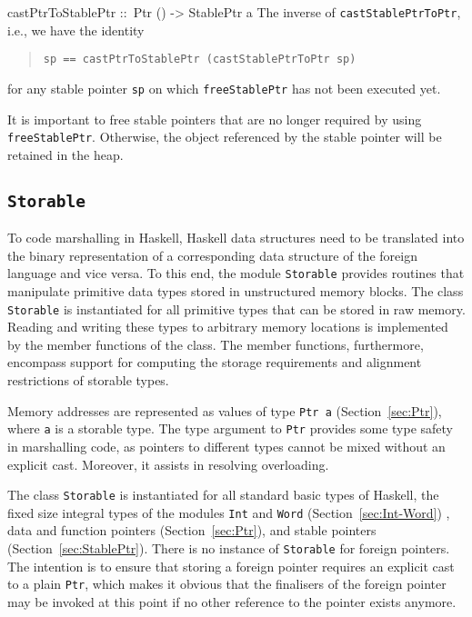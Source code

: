 \documentclass[a4paper,twosides]{article}
\makeatletter
\newcommand{\code}[1]{\texttt{#1}}      %
\newenvironment{codedesc}{%
  \list{}{\labelwidth\z@
    \let\makelabel\codedesclabel}
  }{%
  \endlist
  }
\newcommand*{\codedesclabel}[1]{%
  \hspace{-\leftmargin}
  \parbox[b]{\labelwidth}{\makebox[0pt][l]{\code{#1}}\\}\hfil\relax
  }
\makeatother
\begin{document}
\begin{codedesc}
\item[castPtrToStablePtr ::\ Ptr () -> StablePtr a] The inverse of
  \code{castStablePtrToPtr}, i.e., we have the identity
  \begin{quote}
\begin{verbatim}
sp == castPtrToStablePtr (castStablePtrToPtr sp)
\end{verbatim}
  \end{quote}
  for any stable pointer \code{sp} on which \code{freeStablePtr} has not been
  executed yet.
\end{codedesc}

It is important to free stable pointers that are no longer required by using
\code{freeStablePtr}.  Otherwise, the object referenced by the stable pointer
will be retained in the heap.


\subsection{\code{Storable}}
\label{sec:Storable}

To code marshalling in Haskell, Haskell data structures need to be translated
into the binary representation of a corresponding data structure of the
foreign language and vice versa.  To this end, the module \code{Storable}
provides routines that manipulate primitive data types stored in unstructured
memory blocks.  The class \code{Storable} is instantiated for all primitive
types that can be stored in raw memory.  Reading and writing these types to
arbitrary memory locations is implemented by the member functions of the
class.  The member functions, furthermore, encompass support for computing the
storage requirements and alignment restrictions of storable types.

Memory addresses are represented as values of type \code{Ptr a}
(Section~\ref{sec:Ptr}), where \code{a} is a storable type.  The type argument
to \code{Ptr} provides some type safety in marshalling code, as pointers to
different types cannot be mixed without an explicit cast.  Moreover, it
assists in resolving overloading.

The class \code{Storable} is instantiated for all standard basic types of
Haskell, the fixed size integral types of the modules \code{Int} and
\code{Word} (Section~\ref{sec:Int-Word}) , data and function pointers
(Section~\ref{sec:Ptr}), and stable pointers (Section~\ref{sec:StablePtr}).
There is no instance of \code{Storable} for foreign pointers.  The intention
is to ensure that storing a foreign pointer requires an explicit cast to a
plain \code{Ptr}, which makes it obvious that the finalisers of the foreign
pointer may be invoked at this point if no other reference to the pointer
exists anymore.
\end{document}
